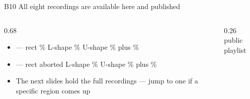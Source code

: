 \documentclass[aspectratio=169,11pt,t]{beamer}
\begin{document}
\begin{frame}{B10 \textperiodcentered{} All eight recordings are available here and published}
  \begin{columns}[T,onlytextwidth]
    \begin{column}{0.68\textwidth}
      \begin{itemize}\bulletgap\small
        \item \hinf{} --- rect \CovRectHinf\% \textperiodcentered{} L-shape
              \CovLshapeHinf\% \textperiodcentered{} U-shape \CovUshapeHinf\%
              \textperiodcentered{} plus \CovPlusHinf\%
        \item \lqr{} --- rect aborted \textperiodcentered{} L-shape
              \CovLshapeLqr\% \textperiodcentered{} U-shape \CovUshapeLqr\%
              \textperiodcentered{} plus \CovPlusLqr\%
        \item The next slides hold the full recordings --- jump to one if a
              specific region comes up
      \end{itemize}
    \end{column}
    \begin{column}{0.26\textwidth}
      \centering\playlistqr[22mm]\\[1ex]
      {\color{epicmuted}\scriptsize public playlist}
    \end{column}
  \end{columns}
\end{frame}
\end{document}
